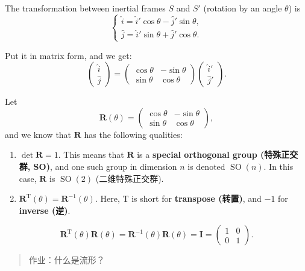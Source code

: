 The transformation between inertial frames \(S\) and \(S'\) (rotation by
an angle \(\theta\)) is \[\left\{
    \begin{array}{l}
        \hat i = \hat i' \cos \theta - \hat j' \sin \theta, \\
        \hat j = \hat i' \sin \theta + \hat j' \cos \theta.
    \end{array}
\right.\]

Put it in matrix form, and we get: \[\begin{pmatrix}
    \hat i \\
    \hat j
\end{pmatrix} =
\begin{pmatrix}
    \cos \theta & -\sin \theta \\
    \sin \theta & \cos \theta
\end{pmatrix}
\begin{pmatrix}
    \hat i' \\
    \hat j'
\end{pmatrix}.\]

Let \[\mathbf R(\theta) = 
\begin{pmatrix}
\cos \theta & -\sin \theta \\
\sin \theta & \cos \theta
\end{pmatrix},\] and we know that \(\mathbf R\) has the following
qualities:

\begin{enumerate}
\def\labelenumi{(\arabic{enumi})}
\item
  \(\det \mathbf R = 1.\) This means that \(\mathbf R\) is a
  \textbf{special orthogonal group (特殊正交群, SO)}, and one such group
  in dimension \(n\) is denoted \(\operatorname{SO}(n)\). In this case,
  \(\mathbf R\) is \(\operatorname{SO}(2)\) (二维特殊正交群).
\item
  \(\mathbf R^\mathrm{T}(\theta) = \mathbf R^{-1} (\theta).\) Here,
  \(\mathrm T\) is short for \textbf{transpose (转置)}, and \(-1\) for
  \textbf{inverse (逆)}.
\end{enumerate}

\[\mathbf R^\mathrm{T}(\theta) \mathbf R(\theta) = \mathbf R^{-1} (\theta) \mathbf R(\theta) = \mathbf I = \begin{pmatrix}
1 & 0 \\
0 & 1
\end{pmatrix}.\]

\begin{quote}
作业：什么是流形？
\end{quote}

